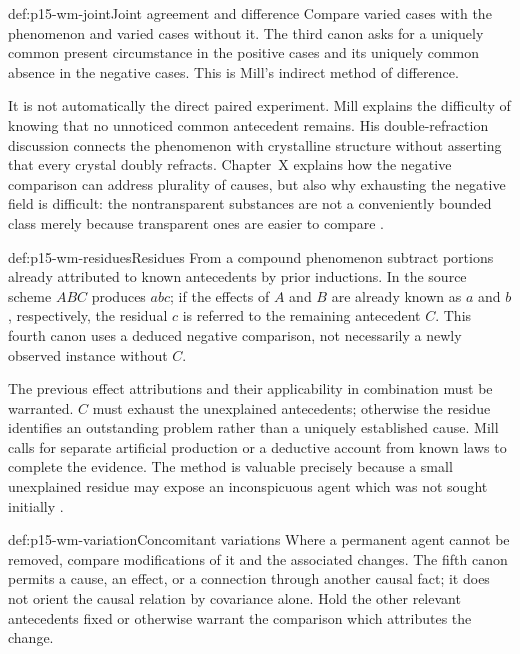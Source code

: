 \begin{hbmethod}{def:p15-wm-joint}{Joint agreement and difference}
Compare varied cases with the phenomenon and varied cases without it.
The third canon asks for a uniquely common present circumstance in
the positive cases and its uniquely common absence in the negative cases.
This is Mill's indirect method of difference.
\end{hbmethod}

It is not automatically the direct paired experiment.
Mill explains the difficulty of knowing that no unnoticed common
antecedent remains. His double-refraction discussion connects the
phenomenon with crystalline structure without asserting that every
crystal doubly refracts. Chapter~X explains how the negative comparison
can address plurality of causes, but also why exhausting the negative
field is difficult: the nontransparent substances are not a conveniently
bounded class merely because transparent ones are easier to compare
\parencite[III.VIII.4; III.X.2]{Mill1882SystemLogicPG}.

\begin{hbmethod}{def:p15-wm-residues}{Residues}
From a compound phenomenon subtract portions already attributed to
known antecedents by prior inductions. In the source scheme \(ABC\)
produces \(abc\); if the effects of \(A\) and \(B\) are already known
as \(a\) and \(b\), respectively, the residual \(c\) is referred to
the remaining antecedent \(C\).
This fourth canon uses a deduced negative comparison, not necessarily
a newly observed instance without \(C\).
\end{hbmethod}

The previous effect attributions and their applicability in combination
must be warranted. \(C\) must exhaust the unexplained antecedents;
otherwise the residue identifies an outstanding problem rather than
a uniquely established cause. Mill calls for separate artificial
production or a deductive account from known laws to complete the evidence.
The method is valuable precisely because a small unexplained residue
may expose an inconspicuous agent which was not sought initially
\parencite[III.VIII.5]{Mill1882SystemLogicPG}.

\begin{hbmethod}{def:p15-wm-variation}{Concomitant variations}
Where a permanent agent cannot be removed, compare modifications of it
and the associated changes. The fifth canon permits a cause, an effect,
or a connection through another causal fact; it does not orient the
causal relation by covariance alone.
Hold the other relevant antecedents fixed or otherwise warrant the
comparison which attributes the change.
\end{hbmethod}

